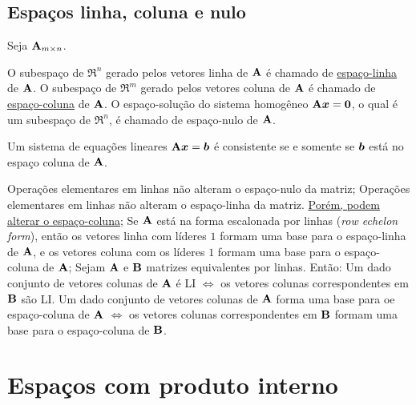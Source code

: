 \subsection{Espaços linha, coluna e nulo}

\begin{definition}
	Seja $\mathbf{A}_{m\times n}$.
	\begin{outline}[enumerate]
		\1 O subespaço de $\Re^n$ gerado pelos vetores linha de $\mathbf{A}$ é chamado de \underline{espaço-linha} de $\mathbf{A}$.
		\1 O subespaço de $\Re^m$ gerado pelos vetores coluna de $\mathbf{A}$ é chamado de \underline{espaço-coluna} de $\mathbf{A}$. 
		\1 O espaço-solução do sistema homogêneo $\mathbf{A} \bm{x} = \bm{0}$, o qual é um subespaço de $\Re^n$, é chamado de espaço-nulo de $\mathbf{A}$.
	\end{outline}
\end{definition}

\begin{theorem}
	Um sistema de equações lineares $\mathbf{A} \bm{x} = \bm{b}$ é consistente se e somente se $\bm{b}$ está no espaço coluna de $\mathbf{A}$.
\end{theorem}

\begin{theorem}
	\leavevmode
	\begin{outline}[enumerate]
		\1 Operações elementares em linhas não alteram o espaço-nulo da matriz;
		\1 Operações elementares em linhas não alteram o espaço-linha da matriz. \uline{Porém, podem alterar o espaço-coluna};
		\1 Se $\mathbf{A}$ está na forma escalonada por linhas (\textit{row echelon form}), então os vetores linha com líderes $1$ formam uma base para o espaço-linha de $\mathbf{A}$, e os vetores coluna com os líderes $1$ formam uma base para o espaço-coluna de $\mathbf{A}$; 
		\1 Sejam $\mathbf{A}$ e $\mathbf{B}$ matrizes equivalentes por linhas. Então:
		\2 Um dado conjunto de vetores colunas de $\mathbf{A}$ é LI $\iff$ os vetores colunas correspondentes em $\mathbf{B}$ são LI.
		\2 Um dado conjunto de vetores colunas de $\mathbf{A}$ forma uma base para oe espaço-coluna de $\mathbf{A}$ $\iff$ os vetores colunas correspondentes em $\mathbf{B}$ formam uma base para o espaço-coluna de $\mathbf{B}$.
	\end{outline}
\end{theorem}

\section{Espaços com produto interno}

